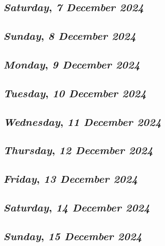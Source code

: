 \def\day{\textit{7 December 2024}}
\def\weekday{\textit{Saturday}}
\subsection*{\weekday, \day}

\def\day{\textit{8 December 2024}}
\def\weekday{\textit{Sunday}}
\subsection*{\weekday, \day}

\def\day{\textit{9 December 2024}}
\def\weekday{\textit{Monday}}
\subsection*{\weekday, \day}

\def\day{\textit{10 December 2024}}
\def\weekday{\textit{Tuesday}}
\subsection*{\weekday, \day}

\def\day{\textit{11 December 2024}}
\def\weekday{\textit{Wednesday}}
\subsection*{\weekday, \day}

\def\day{\textit{12 December 2024}}
\def\weekday{\textit{Thursday}}
\subsection*{\weekday, \day}

\def\day{\textit{13 December 2024}}
\def\weekday{\textit{Friday}}
\subsection*{\weekday, \day}

\def\day{\textit{14 December 2024}}
\def\weekday{\textit{Saturday}}
\subsection*{\weekday, \day}

\def\day{\textit{15 December 2024}}
\def\weekday{\textit{Sunday}}
\subsection*{\weekday, \day}

